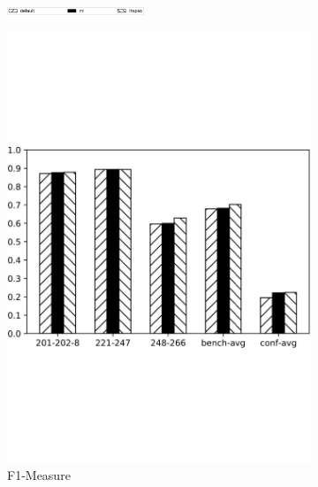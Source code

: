 \documentclass[twoside]{article}
\begin{document}
\begin{figure}[htb!]\centering
\begin{subfigure}{\textwidth}
	\centering
\includegraphics[width=0.45\textwidth]{figures/t_legend.pdf}
\end{subfigure}
\begin{subfigure}{0.3\textwidth}
	\centering
\includegraphics[width=\textwidth]{data_figs/MulRegress_OLA_F1.pdf}
\caption{F1-Measure}
\label{fig:MultiRegress_OLA_F1}
\end{subfigure}
\begin{subfigure}{0.3\textwidth}
	\centering

\end{subfigure}
\end{figure}
\end{document}
